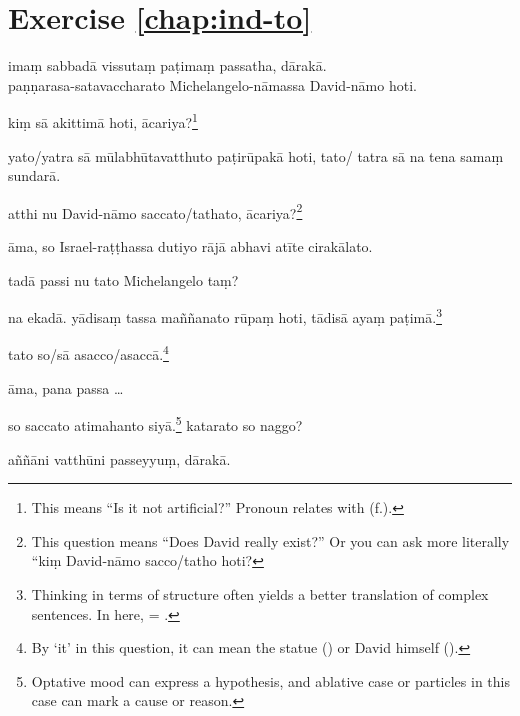 \section*{Exercise \ref{chap:ind-to}}
\begin{answerkey}
\item ima\d m sabbad\=a vissuta\d m pa\d tima\d m passatha, d\=arak\=a. \\pa\d n\d narasa-satavaccharato Michelangelo-n\=amassa David-n\=amo hoti.
\item ki\d m s\=a akittim\=a hoti, \=acariya?\footnote{This means ``Is it not artificial?'' Pronoun  relates with  (f.).}
\item yato/yatra s\=a m\=ulabh\=utavatthuto pa\d tir\=upak\=a hoti, tato/ tatra s\=a na tena sama\d m sundar\=a.
\item atthi nu David-n\=amo saccato/tathato, \=acariya?\footnote{This question means ``Does David really exist?'' Or you can ask more literally ``ki\d m David-n\=amo sacco/tatho hoti?}
\item \=ama, so Israel-ra\d t\d thassa dutiyo r\=aj\=a abhavi at\=ite cirak\=alato.
\item tad\=a passi nu tato Michelangelo ta\d m?
\item na ekad\=a. y\=adisa\d m tassa ma\~n\~nanato r\=upa\d m hoti, t\=adis\=a aya\d m pa\d tim\=a.\footnote{Thinking in terms of  structure often yields a better translation of complex sentences. In here,  = .}
\item tato so/s\=a asacco/asacc\=a.\footnote{By `it' in this question, it can mean the statue () or David himself ().}
\item \=ama, pana passa \ldots
\item so saccato atimahanto siy\=a.\footnote{Optative mood can express a hypothesis, and ablative case or  particles in this case can mark a cause or reason.} katarato so naggo?
\item a\~n\~n\=ani vatth\=uni passeyyu\d m, d\=arak\=a.
\end{answerkey}

